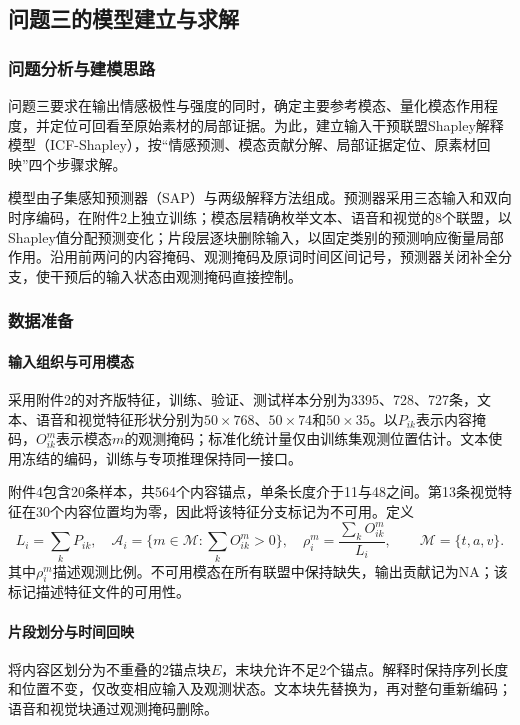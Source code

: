 \subsection{问题三的模型建立与求解}
\label{sec:q3}
\subsubsection{问题分析与建模思路}
问题三要求在输出情感极性与强度的同时，确定主要参考模态、量化模态作用程度，并定位可回看至原始素材的局部证据。为此，建立输入干预联盟Shapley解释模型（ICF-Shapley），按“情感预测、模态贡献分解、局部证据定位、原素材回映”四个步骤求解。

模型由子集感知预测器（SAP）与两级解释方法组成。预测器采用三态输入和双向时序编码，在附件2上独立训练；模态层精确枚举文本、语音和视觉的8个联盟，以Shapley值分配预测变化；片段层逐块删除输入，以固定类别的预测响应衡量局部作用。沿用前两问的内容掩码、观测掩码及原词时间区间记号，预测器关闭补全分支，使干预后的输入状态由观测掩码直接控制。

\subsubsection{数据准备}
\paragraph{输入组织与可用模态}
采用附件2的对齐版特征，训练、验证、测试样本分别为3395、728、727条，文本、语音和视觉特征形状分别为$50\times768$、$50\times74$和$50\times35$。以$P_{ik}$表示内容掩码，$O^m_{ik}$表示模态$m$的观测掩码；标准化统计量仅由训练集观测位置估计。文本使用冻结的编码，训练与专项推理保持同一接口。

附件4包含20条样本，共564个内容锚点，单条长度介于11与48之间。第13条视觉特征在30个内容位置均为零，因此将该特征分支标记为不可用。定义
\begin{equation}
L_i=\sum_kP_{ik},\quad \mathcal A_i=\{m\in\mathcal M:\sum_kO^m_{ik}>0\},\quad
\rho_i^m=\frac{\sum_kO^m_{ik}}{L_i},\qquad\mathcal M=\{t,a,v\}.
\end{equation}
其中$\rho_i^m$描述观测比例。不可用模态在所有联盟中保持缺失，输出贡献记为NA；该标记描述特征文件的可用性。

\paragraph{片段划分与时间回映}
将内容区划分为不重叠的2锚点块$E$，末块允许不足2个锚点。解释时保持序列长度和位置不变，仅改变相应输入及观测状态。文本块先替换为\file{[UNK]}，再对整句重新编码；语音和视觉块通过观测掩码删除。

